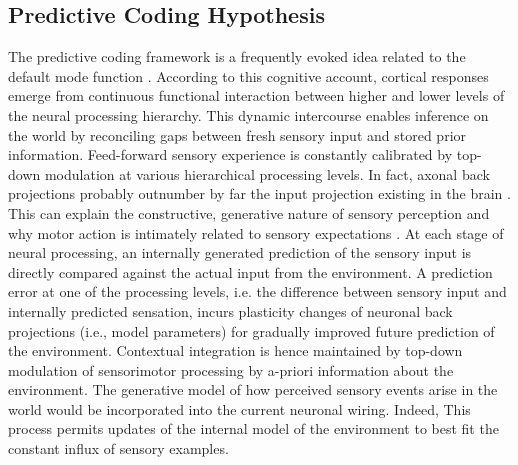 \documentclass[10pt,letterpaper]{article}
\begin{document}
\subsection{Predictive Coding Hypothesis}
The predictive coding framework
\citep{clark2013whatever, friston2008hierarchical}
is a frequently evoked idea related to the default mode function
\citep{bar2007}.
According to this cognitive account,
cortical responses emerge from continuous functional interaction between
higher and lower levels of the neural processing hierarchy.
This dynamic intercourse enables inference on the world by reconciling
gaps between fresh sensory input and stored prior information.
Feed-forward sensory experience is constantly calibrated by
top-down modulation at various hierarchical processing levels.
In fact, axonal
back projections probably outnumber by far the input projection
existing in the brain \citep{salin1995corticocortical}.
This can explain the constructive, generative nature of sensory perception
\citep{friston2010free} and
why motor action is intimately related to sensory expectations
\citep{wolpert1995internal, kording2004bayesian}.
At each stage of neural processing,
an internally generated prediction of the sensory input is
directly compared against the actual input from the environment.
A prediction error at one of the processing levels,
i.e. the difference between sensory input
and internally predicted sensation,
incurs plasticity changes of neuronal back projections (i.e., model parameters)
for gradually improved future prediction of the environment.
Contextual integration is hence maintained by top-down modulation of sensorimotor
processing by a-priori information about the environment.
The generative model of how perceived sensory events arise in the
world would be incorporated into
the current neuronal wiring.
Indeed,
This process permits updates of the internal model of the environment
to best fit the constant influx of sensory examples.
\end{document}
